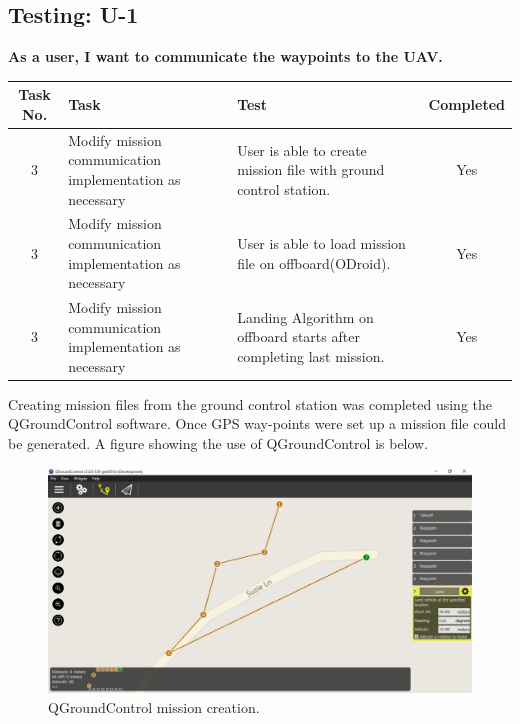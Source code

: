 \subsection{Testing: U-1}
\textbf{As a user, I want to communicate the waypoints to the UAV.}\\
\begin{tabular}{| c | >{\raggedright}m{4cm} | m{4cm} | c |}\hline
	Task No. & Task & Test & Completed\\\hline
	3 & Modify mission communication implementation as necessary & User is able to create mission file with ground control station. & Yes\\\hline
	3 & Modify mission communication implementation as necessary & User is able to load mission file on offboard(ODroid). & Yes\\\hline
	3 & Modify mission communication implementation as necessary & Landing Algorithm on offboard starts after completing last mission. & Yes\\\hline
\end{tabular}
\vfill
Creating mission files from the ground control station was completed using the QGroundControl software. Once GPS way-points were set up a mission file could be generated. A figure showing the use of QGroundControl is below.
\begin{figure}[H]
	\centering
	\includegraphics[width=\textwidth]{images/route1.PNG}
	\caption{QGroundControl mission creation.}
\end{figure}

\newpage
